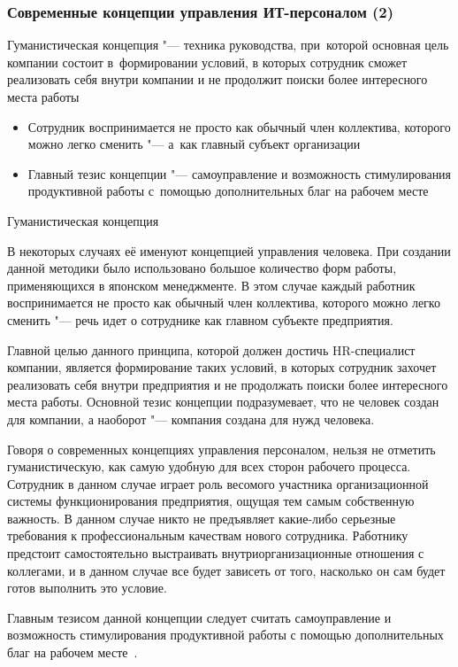 \documentclass{../industrial-development}
\begin{document}
	\begin{frame} \frametitle{Современные концепции управления ИТ-персоналом (2)}
		\alert{Гуманистическая концепция} "--- техника руководства, при~которой основная цель компании состоит в~формировании условий, в которых сотрудник сможет реализовать себя внутри компании и не продолжит поиски более интересного места работы 
		\begin{itemize}
			\item Сотрудник воспринимается не просто как обычный член коллектива, которого можно легко сменить "--- а~как главный субъект организации
			\item Главный тезис концепции "--- самоуправление и возможность стимулирования продуктивной работы с~помощью дополнительных благ на рабочем месте
		\end{itemize}
	\end{frame}
	
	\lecturenotes
	
	\alert{Гуманистическая концепция}
	
	В некоторых случаях её именуют концепцией управления человека. При создании данной методики было использовано большое количество форм работы, применяющихся в японском менеджменте. В этом случае каждый работник воспринимается не просто как обычный член коллектива, которого можно легко сменить "--- речь идет о сотруднике как главном субъекте предприятия.
	
	Главной целью данного принципа, которой должен достичь HR-специалист компании, является формирование таких условий, в которых сотрудник захочет реализовать себя внутри предприятия и не продолжать поиски более интересного места работы. Основной тезис концепции подразумевает, что не человек создан для компании, а наоборот "--- компания создана для нужд человека.
	
	Говоря о современных концепциях управления персоналом, нельзя не отметить гуманистическую, как самую удобную для всех сторон рабочего процесса. Сотрудник в данном случае играет роль весомого участника организационной системы функционирования предприятия, ощущая тем самым собственную важность. В данном случае никто не предъявляет какие-либо серьезные требования к профессиональным качествам нового сотрудника. Работнику предстоит самостоятельно выстраивать внутриорганизационные отношения с коллегами, и в данном случае все будет зависеть от того, насколько он сам будет готов выполнить это условие.
	
	Главным тезисом данной концепции следует считать самоуправление и возможность стимулирования продуктивной работы с помощью дополнительных благ на рабочем месте~\cite{Sovrconcept}. 
	
\end{document}
